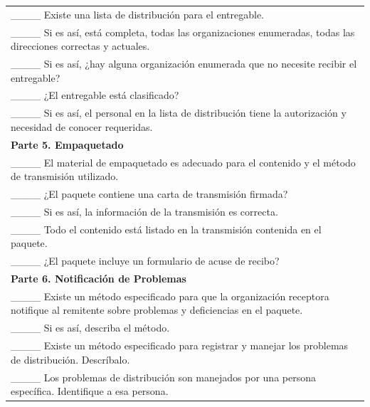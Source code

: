 \begin{table}[H]
\begin{tabular}{|p{14cm}|}
\_\_\_\_ Existe una lista de distribución para el entregable. \\
\_\_\_\_ Si es así, está completa, todas las organizaciones enumeradas, todas las direcciones correctas y actuales. \\
\_\_\_\_ Si es así, ¿hay alguna organización enumerada que no necesite recibir el entregable? \\
\_\_\_\_ ¿El entregable está clasificado? \\
\_\_\_\_ Si es así, el personal en la lista de distribución tiene la autorización y necesidad de conocer requeridas. \\
\textbf{Parte 5. Empaquetado} \\
\_\_\_\_ El material de empaquetado es adecuado para el contenido y el método de transmisión utilizado. \\
\_\_\_\_ ¿El paquete contiene una carta de transmisión firmada? \\
\_\_\_\_ Si es así, la información de la transmisión es correcta. \\
\_\_\_\_ Todo el contenido está listado en la transmisión contenida en el paquete. \\
\_\_\_\_ ¿El paquete incluye un formulario de acuse de recibo? \\
\textbf{Parte 6. Notificación de Problemas} \\
\_\_\_\_ Existe un método especificado para que la organización receptora notifique al remitente sobre problemas y deficiencias en el paquete. \\
\_\_\_\_ Si es así, describa el método. \\
\_\_\_\_ Existe un método especificado para registrar y manejar los problemas de distribución. Descríbalo. \\
\_\_\_\_ Los problemas de distribución son manejados por una persona específica. Identifique a esa persona. \\
\hline
\end{tabular}
\end{table}


